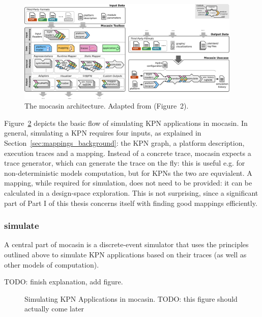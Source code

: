 \begin{figure}[h]
	\centering
   \includegraphics[width=0.95\textwidth]{figures/mocasin.pdf}
	\caption{The mocasin architecture. Adapted from \cite{menard_rapido21} (Figure~2).}
	\label{fig:mocasin_kpn_simulation}
\end{figure}


Figure~\ref{fig:mocasin_kpn_simulation} depicts the basic flow of simulating KPN applications in mocasin.
In general, simulating a KPN requires four inputs, as explained in Section~\ref{sec:mappings_background}: the KPN graph, a platform description, execution traces and a mapping.
Instead of a concrete trace, mocasin expects a trace generator, which can generate the trace on the fly: this is useful e.g. for non-deterministic models computation, but for KPNs the two are equvialent.
A mapping, while required for simulation, does not need to be provided: it can be calculated in a design-space exploration.
This is not surprising, since a significant part of Part I of this thesis concerns itself with finding good mappings efficiently.

\subsubsection{simulate}
A central part of mocasin is a discrete-event simulator that uses the principles outlined above to simulate KPN applications based on their traces (as well as other models of computation).


TODO: finish explanation, add figure.

\begin{figure}[h]
	\centering
   \resizebox{0.95\textwidth}{!}{}
	\caption{Simulating KPN Applications in mocasin. TODO: this figure should actually come later}
	\label{fig:mocasin_kpn_simulation}
\end{figure}
